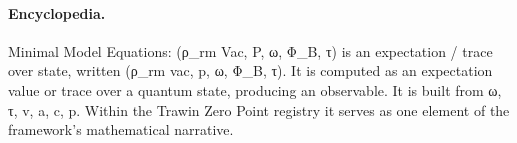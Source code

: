 \paragraph{Encyclopedia.}
Minimal Model Equations: (ρ\_rm Vac, P, ω, Φ\_B, τ) is an expectation / trace over state, written (ρ\_rm vac, p, ω, Φ\_B, τ). It is computed as an expectation value or trace over a quantum state, producing an observable. It is built from ω, τ, v, a, c, p. Within the Trawin Zero Point registry it serves as one element of the framework's mathematical narrative.
